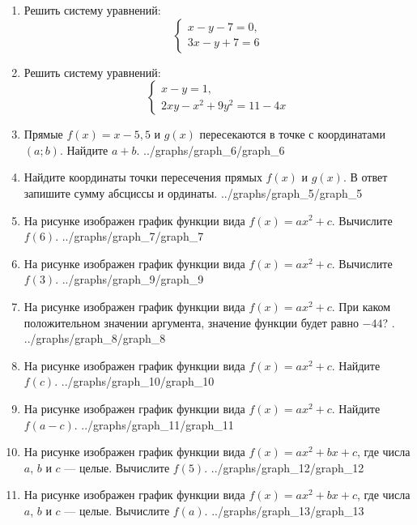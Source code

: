 \documentclass[12pt, a4paper]{article}
\begin{document}
	  
	\begin{enumerate}
		\item Решить систему уравнений:
		$$\left\{
		\begin{array}{l}
			x-y-7=0,\\
			3x-y+7=6
		\end{array}
		\right.$$ 
		\item Решить систему уравнений:
		$$\left\{
		\begin{array}{l}
			x-y=1,\\
			2xy-x^2+9y^2=11-4x
		\end{array}
		\right.$$ 
		\item \funcexer
		{Прямые $f(x)=x-5,5$ и $g(x)$ пересекаются в точке с координатами $(a;b)$. Найдите $a+b$. }
		{../graphs/graph_6/graph_6}
		\item \funcexer
		{Найдите координаты точки пересечения прямых $f(x)$ и $g(x)$. В ответ запишите сумму абсциссы и ординаты. }
		{../graphs/graph_5/graph_5}
		\item \funcexer
		{На рисунке изображен график функции вида $f(x)=ax^2+c$. Вычислите $f(6)$. }
		{../graphs/graph_7/graph_7}
		\item \funcexer
		{На рисунке изображен график функции вида $f(x)=ax^2+c$. Вычислите $f(3)$. }
		{../graphs/graph_9/graph_9}
		\item \funcexer
		{На рисунке изображен график функции вида $f(x)=ax^2+c$. При каком положительном значении аргумента, значение функции будет равно $-44$? .}
		{../graphs/graph_8/graph_8}
		\item \funcexer
		{На рисунке изображен график функции вида $f(x)=ax^2+c$. Найдите $f(c)$. }
		{../graphs/graph_10/graph_10}
		\item \funcexer
		{На рисунке изображен график функции вида $f(x)=ax^2+c$. Найдите $f(a-c)$. }
		{../graphs/graph_11/graph_11}
		\item \funcexer
		{На рисунке изображен график функции вида $f(x)=ax^2+bx+c$, где числа $a$, $b$ и $c$ — целые. Вычислите $f(5)$. }
		{../graphs/graph_12/graph_12}
		\item \funcexer
		{На рисунке изображен график функции вида $f(x)=ax^2+bx+c$, где числа $a$, $b$ и $c$ — целые. Вычислите $f(a)$. }
		{../graphs/graph_13/graph_13}
	\end{enumerate}
\end{document}
